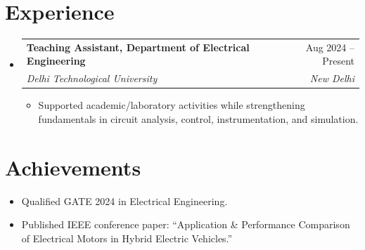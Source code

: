 \documentclass[letterpaper,10pt]{article}
\makeatletter
\newcommand{\resumeItem}[1]{\item\footnotesize{{#1 \vspace{-4pt}}}}
\newcommand{\resumeSubheading}[4]{
  \vspace{-1pt}\item
    \begin{tabular*}{0.97\textwidth}[t]{l@{\extracolsep{\fill}}r}
      \textbf{#1} & #2 \\
      \textit{\footnotesize#3} & \textit{\footnotesize #4} \\
    \end{tabular*}\vspace{-4pt}
}
\newcommand{\resumeSubHeadingListStart}{\begin{itemize}[leftmargin=0.13in, label={}, itemsep=0pt]}
\newcommand{\resumeSubHeadingListEnd}{\end{itemize}}
\newcommand{\resumeItemListStart}{\begin{itemize}[leftmargin=0.17in, itemsep=2pt]}
\newcommand{\resumeItemListEnd}{\end{itemize}\vspace{-4pt}}
\makeatother
\begin{document}
\section{Experience}
  \resumeSubHeadingListStart
    \resumeSubheading{Teaching Assistant, Department of Electrical Engineering}{Aug 2024 -- Present}{Delhi Technological University}{New Delhi}
      \resumeItemListStart
        \resumeItem{Supported academic/laboratory activities while strengthening fundamentals in circuit analysis, control, instrumentation, and simulation.}
      \resumeItemListEnd
  \resumeSubHeadingListEnd

\section{Achievements}
 \begin{itemize}[leftmargin=0.17in, itemsep=2pt]
    \item \footnotesize{Qualified GATE 2024 in Electrical Engineering.}
    \item \footnotesize{Published IEEE conference paper: ``Application \& Performance Comparison of Electrical Motors in Hybrid Electric Vehicles.''}
 \end{itemize}
\end{document}
